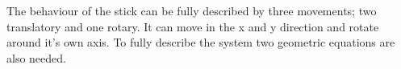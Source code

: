 The behaviour of the stick can be fully described by three movements; two translatory and one rotary. It can move in the x and y direction and rotate around it's own axis. To fully describe the system two geometric equations are also needed.

%
%

